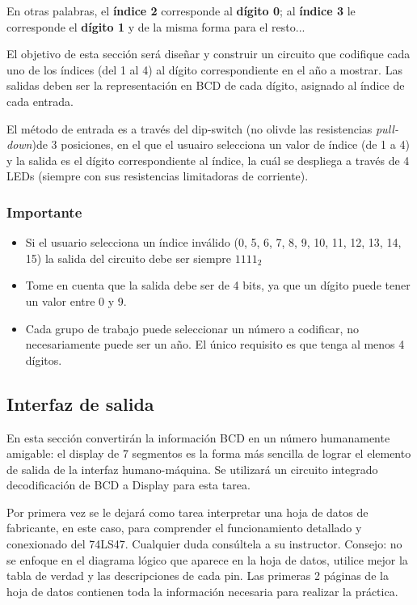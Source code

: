 En otras palabras, el \textbf{índice 2} corresponde al \textbf{dígito 0}; al \textbf{índice 3} le corresponde el \textbf{dígito 1} y de la misma forma para el resto...

\vspace{14 pt}

El objetivo de esta sección será diseñar y construir un circuito que codifique cada uno de los índices (del 1 al 4) al dígito correspondiente en el año a mostrar.
Las salidas deben ser la representación en BCD de cada dígito, asignado al índice de cada entrada.

\vspace{14 pt}

El método de entrada es a través del dip-switch (no olivde las resistencias \emph{pull-down})de 3 posiciones, en el que el usuairo
selecciona un valor de índice (de 1 a 4) y la salida es el dígito correspondiente al índice,
la cuál se despliega a través de 4 LEDs (siempre con sus resistencias limitadoras de corriente).

\subsubsection*{Importante}
\begin{itemize}
    \item Si el usuario selecciona un índice inválido (0, 5, 6, 7, 8, 9, 10, 11, 12, 13, 14, 15) la salida del circuito debe ser siempre $1111_2$
    \item Tome en cuenta que la salida debe ser de 4 bits, ya que un dígito puede tener un valor entre 0 y 9.
    \item Cada grupo de trabajo puede seleccionar un número a codificar, no necesariamente puede ser un año. El único requisito es que tenga al menos 4 dígitos.
\end{itemize}

\subsection{Interfaz de salida}
En esta sección convertirán la información BCD en un número humanamente amigable: el display de 7 segmentos es la forma más sencilla de lograr
el elemento de salida de la interfaz humano-máquina. Se utilizará un circuito integrado decodificación de BCD a Display para esta tarea.

Por primera vez se le dejará como tarea interpretar una hoja de datos de fabricante, en este caso, para comprender el funcionamiento detallado y
conexionado del 74LS47. Cualquier duda consúltela a su instructor. Consejo: no se enfoque en el diagrama lógico que aparece en la hoja de datos,
utilice mejor la tabla de verdad y las descripciones de cada pin. Las primeras 2 páginas de la hoja de datos contienen toda la información necesaria
para realizar la práctica.


